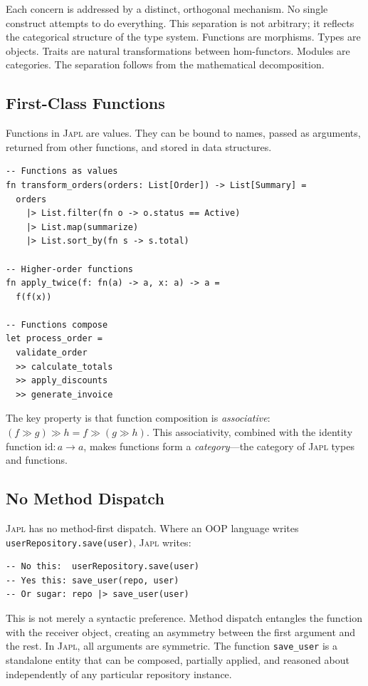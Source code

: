 \documentclass[11pt,a4paper]{article}
\newcommand{\japl}{\textsc{Japl}}
\newcommand{\id}{\mathrm{id}}
\begin{document}
Each concern is addressed by a distinct, orthogonal mechanism. No single construct attempts to do everything. This separation is not arbitrary; it reflects the categorical structure of the type system. Functions are morphisms. Types are objects. Traits are natural transformations between hom-functors. Modules are categories. The separation follows from the mathematical decomposition.

\subsection{First-Class Functions}

Functions in \japl{} are values. They can be bound to names, passed as arguments, returned from other functions, and stored in data structures.

\begin{lstlisting}
-- Functions as values
fn transform_orders(orders: List[Order]) -> List[Summary] =
  orders
    |> List.filter(fn o -> o.status == Active)
    |> List.map(summarize)
    |> List.sort_by(fn s -> s.total)

-- Higher-order functions
fn apply_twice(f: fn(a) -> a, x: a) -> a =
  f(f(x))

-- Functions compose
let process_order =
  validate_order
  >> calculate_totals
  >> apply_discounts
  >> generate_invoice
\end{lstlisting}

The key property is that function composition is \emph{associative}: $(f \gg g) \gg h = f \gg (g \gg h)$. This associativity, combined with the identity function $\id : a \to a$, makes functions form a \emph{category}---the category of \japl{} types and functions.

\subsection{No Method Dispatch}

\japl{} has no method-first dispatch. Where an OOP language writes \texttt{user\-Repository.save(user)}, \japl{} writes:

\begin{lstlisting}
-- No this:  userRepository.save(user)
-- Yes this: save_user(repo, user)
-- Or sugar: repo |> save_user(user)
\end{lstlisting}

This is not merely a syntactic preference. Method dispatch entangles the function with the receiver object, creating an asymmetry between the first argument and the rest. In \japl{}, all arguments are symmetric. The function \texttt{save\_user} is a standalone entity that can be composed, partially applied, and reasoned about independently of any particular repository instance.
\end{document}
